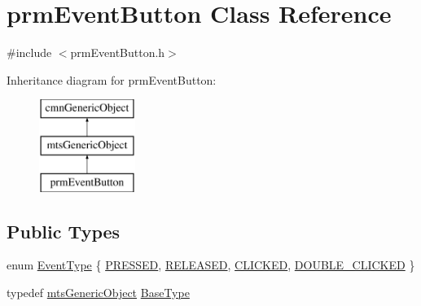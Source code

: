 \hypertarget{classprm_event_button}{}\section{prm\+Event\+Button Class Reference}
\label{classprm_event_button}


{\ttfamily \#include $<$prm\+Event\+Button.\+h$>$}

Inheritance diagram for prm\+Event\+Button\+:\begin{figure}[H]
\begin{center}
\leavevmode
\includegraphics[height=3.000000cm]{da/df2/classprm_event_button}
\end{center}
\end{figure}
\subsection*{Public Types}
\begin{DoxyCompactItemize}
\item 
enum \hyperlink{classprm_event_button_ad25147a00b664a6df0de483dad956b0b}{Event\+Type} \{ \hyperlink{classprm_event_button_ad25147a00b664a6df0de483dad956b0ba19008009a3d9ae10cbcbcb95bf51a262}{P\+R\+E\+S\+S\+E\+D}, 
\hyperlink{classprm_event_button_ad25147a00b664a6df0de483dad956b0ba4ca564a58137b44d262b43b9c9f8bebb}{R\+E\+L\+E\+A\+S\+E\+D}, 
\hyperlink{classprm_event_button_ad25147a00b664a6df0de483dad956b0ba92d74c7dd98bd68c8118cc5e5b711dca}{C\+L\+I\+C\+K\+E\+D}, 
\hyperlink{classprm_event_button_ad25147a00b664a6df0de483dad956b0ba33ace8686d9bef1b5139573b9c09e7c3}{D\+O\+U\+B\+L\+E\+\_\+\+C\+L\+I\+C\+K\+E\+D}
 \}
\item 
typedef \hyperlink{classmts_generic_object}{mts\+Generic\+Object} \hyperlink{classprm_event_button_ad7f93b9f9585c48633382b39d118c151}{Base\+Type}
\end{DoxyCompactItemize}
